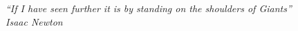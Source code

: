 

\chapter*{}
\begin{flushright}		
\vfill				    

\it ``If I have seen further it is by standing on the shoulders of Giants'' \\
\it Isaac Newton \\

\end{flushright}
